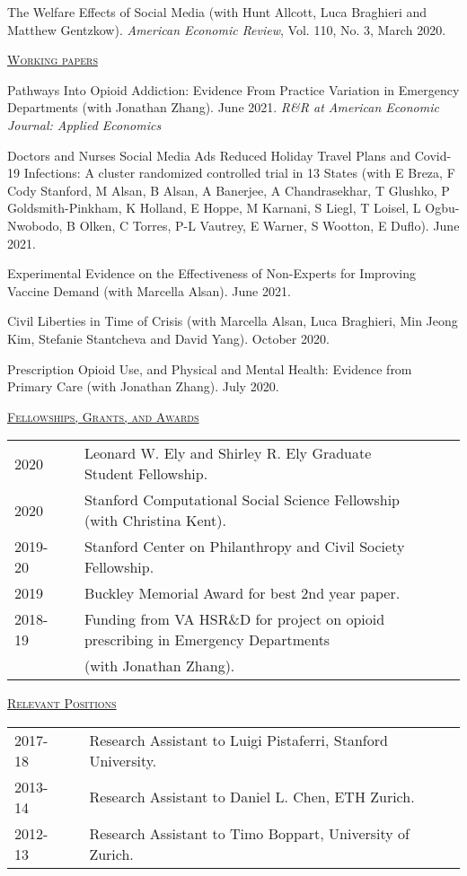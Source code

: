 \documentclass[letterpaper,11pt]{article}
\begin{document}
The Welfare Effects of Social Media (with Hunt Allcott, Luca Braghieri and Matthew Gentzkow). \textit{American Economic Review}, Vol. 110, No. 3, March 2020.

\bigskip

\underline {\textsc{Working papers}}

Pathways Into Opioid Addiction: Evidence From Practice Variation in Emergency Departments (with Jonathan Zhang). June 2021. \textit{R\&R at American Economic Journal: Applied Economics}

Doctors and Nurses Social Media Ads Reduced Holiday Travel Plans and Covid-19 Infections: A cluster randomized controlled trial in 13 States (with E Breza, F Cody Stanford, M Alsan, B Alsan, A Banerjee, A Chandrasekhar, T Glushko, P Goldsmith-Pinkham, K Holland, E Hoppe, M Karnani, S Liegl, T Loisel, L Ogbu-Nwobodo, B Olken, C Torres, P-L Vautrey, E Warner, S Wootton, E Duflo). June 2021.

Experimental Evidence on the Effectiveness of Non-Experts for Improving Vaccine Demand (with Marcella Alsan). June 2021.

Civil Liberties in Time of Crisis (with Marcella Alsan, Luca Braghieri, Min Jeong Kim, Stefanie Stantcheva and David Yang). October 2020.

Prescription Opioid Use, and Physical and Mental Health: Evidence from Primary Care (with Jonathan Zhang). July 2020.

 
 \bigskip


\underline {\textsc{Fellowships, Grants, and Awards}}

\begin{tabular}{@{}l@{}cl@{}cl}
2020 & & Leonard W. Ely and Shirley R. Ely Graduate Student Fellowship. \\
2020 & & Stanford Computational Social Science Fellowship (with Christina Kent). \\
2019-20 & & Stanford Center on Philanthropy and Civil Society Fellowship. \\
2019 & & Buckley Memorial Award for best 2nd year paper. \\
2018-19 & & Funding from VA HSR\&D for project on opioid prescribing in Emergency Departments \\ & & (with Jonathan Zhang).
\end{tabular}
  \newpage
 \bigskip
 
\underline {\textsc{Relevant Positions}}

\begin{tabular}{@{}l@{}cl@{}cl}
2017-18 & & Research Assistant to Luigi Pistaferri, Stanford University. \\
2013-14 & & Research Assistant to Daniel L. Chen, ETH Zurich. \\
2012-13 & & Research Assistant to Timo Boppart, University of Zurich.
\end{tabular}
\end{document}
